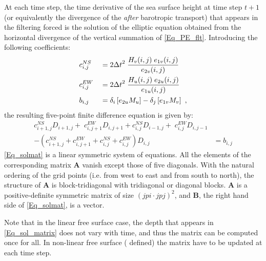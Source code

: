 \documentclass[NEMO_book]{subfiles}
\begin{document}
At each time step, the time derivative of the sea surface height at time step $t+1$ 
(or equivalently the divergence of the \textit{after} barotropic transport) that appears 
in the filtering forced is the solution of the elliptic equation obtained from the horizontal 
divergence of the vertical summation of \eqref{Eq_PE_flt}. 
Introducing the following coefficients:
\begin{equation}  \label{Eq_sol_matrix}
\begin{aligned}
&c_{i,j}^{NS}  &&= {2 \Delta t }^2 \; \frac{H_v (i,j) \; e_{1v} (i,j)}{e_{2v}(i,j)}              \\
&c_{i,j}^{EW} &&= {2 \Delta t }^2 \; \frac{H_u (i,j) \; e_{2u} (i,j)}{e_{1u}(i,j)}            \\
&b_{i,j} &&= \delta_i \left[ e_{2u}M_u \right] - \delta_j \left[ e_{1v}M_v \right]\ ,   \\
\end{aligned}
\end{equation}
the resulting five-point finite difference equation is given by:
\begin{equation}  \label{Eq_solmat}
\begin{split}
       c_{i+1,j}^{NS} D_{i+1,j}  + \;  c_{i,j+1}^{EW} D_{i,j+1}   
  +   c_{i,j}    ^{NS} D_{i-1,j}   + \;  c_{i,j}    ^{EW} D_{i,j-1}                                          &    \\
  -    \left(c_{i+1,j}^{NS} + c_{i,j+1}^{EW} + c_{i,j}^{NS} + c_{i,j}^{EW} \right)   D_{i,j}  &=  b_{i,j}
\end{split}
\end{equation}
\eqref{Eq_solmat} is a linear symmetric system of equations. All the elements of 
the corresponding matrix \textbf{A} vanish except those of five diagonals. With 
the natural ordering of the grid points (i.e. from west to east and from 
south to north), the structure of \textbf{A} is block-tridiagonal with 
tridiagonal or diagonal blocks. \textbf{A} is a positive-definite symmetric 
matrix of size $(jpi \cdot jpj)^2$, and \textbf{B}, the right hand side of 
\eqref{Eq_solmat}, is a vector.

Note that in the linear free surface case, the depth that appears in \eqref{Eq_sol_matrix}
does not vary with time, and thus the matrix can be computed once for all. In non-linear free surface 
( defined) the matrix have to be updated at each time step.

\end{document}
